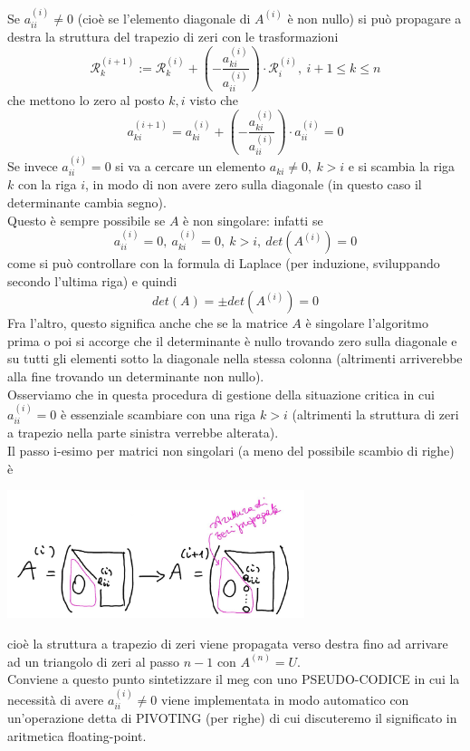 \documentclass[12pt,a4paper]{article}
\begin{document}
Se $a_{ii}^{(i)} \neq 0$ (cioè se l'elemento diagonale di $A^{(i)}$ è non nullo) si può propagare a destra la struttura del trapezio di zeri con le trasformazioni
\[
\mathcal{R}_k^{(i+1)} := \mathcal{R}_k^{(i)} + (-\frac{a_{ki}^{(i)}}{a_{ii}^{(i)}}) \cdot \mathcal{R}_i^{(i)}, \ i+1 \le k \le n
\]
che mettono lo zero al posto $k,i$ visto che
\[
a_{ki}^{(i+1)} = a_{ki}^{(i)} + (-\frac{a_{ki}^{(i)}}{a_{ii}^{(i)}}) \cdot a_{ii}^{(i)} = 0
\]
Se invece $a_{ii}^{(i)} = 0$ si va a cercare un elemento $a_{ki} \neq 0, \ k > i$ e si scambia la riga $k$ con la riga $i$, in modo di non avere zero sulla diagonale (in questo caso il determinante cambia segno).\\
Questo è sempre possibile se $A$ è non singolare: infatti se
\[ a_{ii}^{(i)} = 0, \ a_{ki}^{(i)} = 0,\ k > i, \ det(A^{(i)}) = 0 \]
come si può controllare con la formula di Laplace (per induzione, sviluppando secondo l'ultima riga) e quindi
\[ det(A) = \pm det(A^{(i)}) = 0 \]
Fra l'altro, questo significa anche che se la matrice $A$ è singolare l'algoritmo prima o poi si accorge che il determinante è nullo trovando zero sulla diagonale e su tutti gli elementi sotto la diagonale nella stessa colonna (altrimenti arriverebbe alla fine trovando un determinante non nullo).\\
Osserviamo che in questa procedura di gestione della situazione critica in cui $a_{ii}^{(i)} = 0$ è essenziale scambiare con una riga $k > i$ (altrimenti la struttura di zeri a trapezio nella parte sinistra verrebbe alterata).\\
Il passo i-esimo per matrici non singolari (a meno del possibile scambio di righe) è
\begin{center}
    \includegraphics[width = 0.65\textwidth]{pag20.jpg}
\end{center}
cioè la struttura a trapezio di zeri viene propagata verso destra fino ad arrivare ad un triangolo di zeri al passo $n-1$ con $A^{(n)} = U$.\\
Conviene a questo punto sintetizzare il meg con uno PSEUDO-CODICE in cui la necessità di avere $a_{ii}^{(i)} \neq 0$ viene implementata in modo automatico con un'operazione detta di PIVOTING (per righe) di cui discuteremo il significato in aritmetica floating-point.\\
\end{document}
